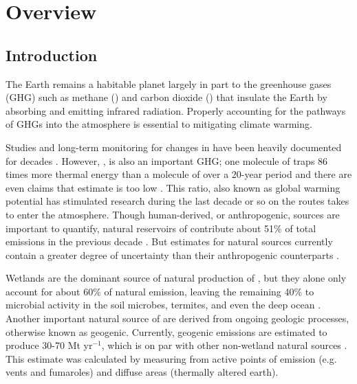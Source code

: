 \section{Overview}
	\subsection{Introduction}
	The Earth remains a habitable planet largely in part to the greenhouse gases (GHG) such as methane () and carbon dioxide () that insulate the Earth by absorbing and emitting infrared radiation. Properly accounting for the pathways of GHGs into the atmosphere is essential to mitigating climate warming.
	
	\vspace{3mm}  \par \noindent
	Studies and long-term monitoring for changes in  have been heavily documented for decades \citep{Keeling1960, Friedlingstein2014}. However, , is also an important GHG; one molecule of  traps 86 times more thermal energy than a molecule of  over a 20-year period and there are even claims that estimate is too low \citep{Howarth2015, Bridgham2013}. This ratio, also known as global warming potential has stimulated research during the last decade or so on the routes  takes to enter the atmosphere. Though human-derived, or anthropogenic, sources are important to quantify, natural reservoirs of  contribute about 51\% of total emissions in the previous decade \citep{Kirschke2013}. But estimates for natural sources currently contain a greater degree of uncertainty than their anthropogenic counterparts \citep{Kirschke2013}. 
	
	\vspace{3mm}  \par \noindent 
	Wetlands are the dominant source of natural production of , but they alone only account for about 60\% of natural emission, leaving the remaining 40\% to microbial activity in the soil microbes, termites, and even the deep ocean \citep{Kirschke2013, Etiope2002a}. Another important natural source of  are derived from ongoing geologic processes, otherwise known as geogenic. Currently, geogenic emissions are estimated to produce 30-70 Mt  yr$^{-1}$, which is on par with other non-wetland natural sources \citep{Etiope2002a}. This estimate was calculated by measuring  from active points of emission (e.g. vents and fumaroles) and diffuse areas (thermally altered earth).
	
